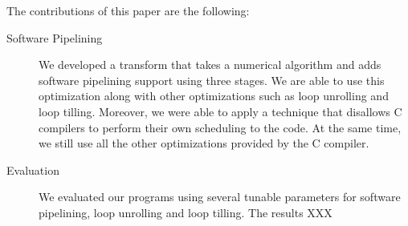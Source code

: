 \documentclass[10pt]{article}
\begin{document}
The contributions of this paper are the following:

\begin{description}
   \item[Software Pipelining] We developed a transform that takes a numerical algorithm and adds software pipelining support
   using three stages. We are able to use this optimization along with other optimizations such as loop unrolling and loop tilling.
   Moreover, we were able to apply a technique that disallows C compilers to perform their own scheduling to the code. At the same
   time, we still use all the other optimizations provided by the C compiler. 
   \item[Evaluation] We evaluated our programs using several tunable parameters for software pipelining,
   loop unrolling and loop tilling. The results XXX
\end{description}

\end{document}
